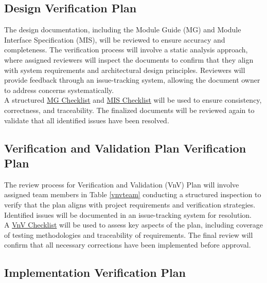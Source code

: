 \documentclass[12pt, titlepage]{article}
\begin{document}
\subsection{Design Verification Plan} \label{3.3} The design documentation,
including the Module Guide (MG) and Module Interface Specification (MIS), will
be reviewed to ensure accuracy and completeness. The verification process will
involve a static analysis approach, where assigned reviewers will inspect the
documents to confirm that they align with system requirements and architectural
design principles. Reviewers will provide feedback through an issue-tracking
system, allowing the document owner to address concerns systematically. \\
A structured
\href{https://github.com/smiths/capTemplate/blob/9251702fdcb9800c59f6ed3d11d91e2bd62fca6d/docs/Checklists/MG-Checklist.pdf}{MG
  Checklist} and
\href{https://github.com/smiths/capTemplate/blob/9251702fdcb9800c59f6ed3d11d91e2bd62fca6d/docs/Checklists/MIS-Checklist.pdf}{MIS
  Checklist} will be used to ensure consistency, correctness, and traceability.
The finalized documents will be reviewed again to validate that all identified
issues have been resolved.

\subsection{Verification and Validation Plan Verification Plan} \label{3.4} The
review process for Verification and Validation (VnV) Plan will involve assigned
team members in Table \ref{vnvteam} conducting a structured inspection to verify that the plan aligns
with project requirements and verification strategies.
Identified issues will be documented in an issue-tracking system for resolution.\\
A
\href{https://github.com/smiths/capTemplate/blob/9251702fdcb9800c59f6ed3d11d91e2bd62fca6d/docs/Checklists/VnV-Checklist.pdf}{VnV
  Checklist} will be used to assess key aspects of the plan, including coverage
of testing methodologies and traceability of requirements. The final review will
confirm that all necessary corrections have been implemented before approval.

\subsection{Implementation Verification Plan} \label{3.5}
\end{document}
